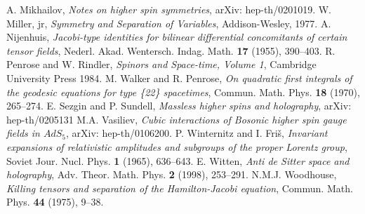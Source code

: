 \documentclass[a4paper,12pt]{amsart}
\begin{document}
\begin{thebibliography}{XX}
 A. Mikhailov,
{\em Notes on higher spin symmetries},
arXiv: hep-th/0201019.
 W. Miller, jr,
{\em Symmetry and Separation of Variables},
Addison-Wesley, 1977.
 A. Nijenhuis,
{\em Jacobi-type identities for bilinear differential concomitants of certain
tensor fields},
Nederl. Akad. Wentersch. Indag. Math. {\bf 17} (1955), 390--403.
 R. Penrose and W. Rindler,
{\em Spinors and Space-time, Volume 1},
Cambridge University Press 1984.
 M. Walker and R. Penrose,
{\em On quadratic first integrals of the geodesic\linebreak
equations for type \{22\} spacetimes},
Commun. Math. Phys. {\bf 18} (1970), 265--274.
 E. Sezgin and P. Sundell,
{\em Massless higher spins and holography},
arXiv: hep-th/0205131
 M.A. Vasiliev,
{\em Cubic interactions of Bosonic higher spin gauge fields in $AdS_5$},
arXiv: hep-th/0106200.
 P. Winternitz and I. Fri\v{s},
{\em Invariant expansions of relativistic amplitudes and subgroups of the
proper Lorentz group}, Soviet Jour. Nucl. Phys. {\bf 1} (1965), 636--643.
 E. Witten,
{\em Anti de Sitter space and holography},
Adv. Theor. Math. Phys. {\bf 2} (1998), 253--291.
 N.M.J. Woodhouse,
{\em Killing tensors and separation of the Hamilton-Jacobi equation},
Commun. Math. Phys. {\bf 44} (1975), 9--38.
\end{thebibliography}
\end{document}

